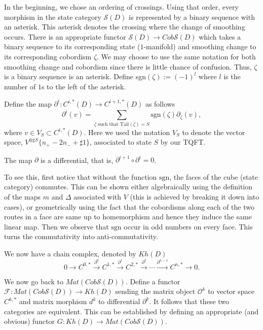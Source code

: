 In the beginning, we chose an ordering of crossings. Using that order, every morphism in the state category $\mathcal S(D)$ is represented by a binary sequence with an asterisk. This asterisk denotes the crossing where the change of smoothing occurs. There is an appropriate functor $\mathcal{S}(D) \to Cob\mathcal{S}(D)$ which takes a binary sequence to its corresponding state ($1$-manifold) and smoothing change to its corresponding cobordism $\zeta$. We may choose to use the same notation for both smoothing change and cobordism since there is little chance of confusion. Thus, $\zeta$ is a binary sequence is an asterisk. Define sgn$(\zeta):= (-1)^{l}$ where $l$ is the number of $1$s to the left of the asterisk.

Define the map $\partial^i : C^{i,*}(D) \to C^{i+1, *}(D)$ as follows 
\begin{equation}
\label{eq:18}
\partial^i(v) = \sum_{\zeta \text{ such that Tail}(\zeta) = S}^{} \text{sgn}(\zeta) \partial_{\zeta}(v),
\end{equation}
where $v \in V_S \subset C^{i,*}(D)$. Here we used the notation $V_S$ to denote the vector space, $V^{\otimes \sharp S} \{n_+ - 2n_- + \sharp 1\}$, associated to state $S$ by our TQFT.

\begin{proposition}
\label{sec:cohom-groups-mathc-15}
The map $\partial$ is a differential, that is, $\partial^{i+1} \circ \partial^i = 0$.
\end{proposition}

To see this, first notice that without the function $\text{sgn}$, the faces of the cube (state category) commutes. This can be shown either algebraically using the definition of the maps $m$ and $\Delta$ associated with $V$ (this is achieved by breaking it down into cases), or geometrically using the fact that the cobordisms along each of the two routes in a face are same up to homemorphism and hence they induce the same linear map. Then we observe that $\text{sgn}$ occur in odd numbers on every face. This turns the commutativity into anti-commutativity.

We now have a chain complex, denoted by $Kh(D)$ 
\begin{equation}
\label{eq:19}
0 \xrightarrow{} C^{0,*} \xrightarrow{\partial^0} C^{1,*} \xrightarrow{\partial^1} C^{2,*} \xrightarrow{\partial^2} \cdots \xrightarrow{\partial^{n-1}} C^{n,*} \xrightarrow{} 0.
\end{equation}

We now go back to $Mat (Cob \mathcal{S}(D))$. Define a functor $\mathcal{F}: Mat (Cob \mathcal{S}(D)) \to Kh(D)$ sending the matrix object $\mathcal{O}^k$ to vector space $C^{k,*}$ and matrix morphism $d^k$ to differential $\partial^k$. It follows that these two categories are equivalent. This can be established by defining an appropriate (and obvious) functor $G: Kh(D) \to Mat (Cob \mathcal{S}(D))$.


